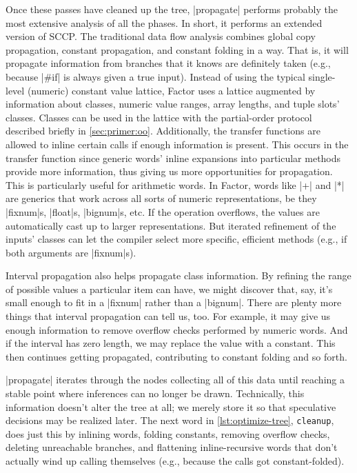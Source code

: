 Once these passes have cleaned up the tree, \factor|propagate| performs
probably the most extensive analysis of all the phases.  In short, it performs
an extended version of \gls{SCCP}.  The traditional data flow
analysis combines global copy propagation, constant propagation, and constant
folding in a  way.  That is, it will propagate information
from branches that it knows are definitely taken (e.g., because \factor|#if| is
always given a true input).  Instead of using the typical single-level
(numeric) constant value lattice, Factor uses a lattice augmented by
information about classes, numeric value ranges, array lengths, and tuple
slots' classes.  Classes can be used in the lattice with the partial-order
protocol described briefly in \cref{sec:primer:oo}.  Additionally, the transfer
functions are allowed to inline certain calls if enough information is present.
This occurs in the transfer function since generic words' inline expansions
into particular methods provide more information, thus giving us more
opportunities for propagation.  This is particularly useful for arithmetic
words.  In Factor, words like \factor|+| and \factor|*| are generics that work
across all sorts of numeric representations, be they \factor|fixnum|s,
\factor|float|s, \factor|bignum|s, etc.  If the operation overflows, the values
are automatically cast up to larger representations.  But iterated refinement
of the inputs' classes can let the compiler select more specific, efficient
methods (e.g., if both arguments are \factor|fixnum|s).

Interval propagation also helps propagate class information.  By refining the
range of possible values a particular item can have, we might discover that,
say, it's small enough to fit in a \factor|fixnum| rather than a
\factor|bignum|.  There are plenty more things that interval propagation can
tell us, too.  For example, it may give us enough information to remove
overflow checks performed by numeric words.  And if the interval has zero
length, we may replace the value with a constant.  This then continues getting
propagated, contributing to constant folding and so forth.

\factor|propagate| iterates through the nodes collecting all of this data until
reaching a stable point where inferences can no longer be drawn.  Technically,
this information doesn't alter the tree at all; we merely store it so that
speculative decisions may be realized later.  The next word in
\vref{lst:optimize-tree}, \Verb|cleanup|, does just this by inlining words,
folding constants, removing overflow checks, deleting unreachable branches, and
flattening inline-recursive words that don't actually wind up calling
themselves (e.g., because the calls got constant-folded).


